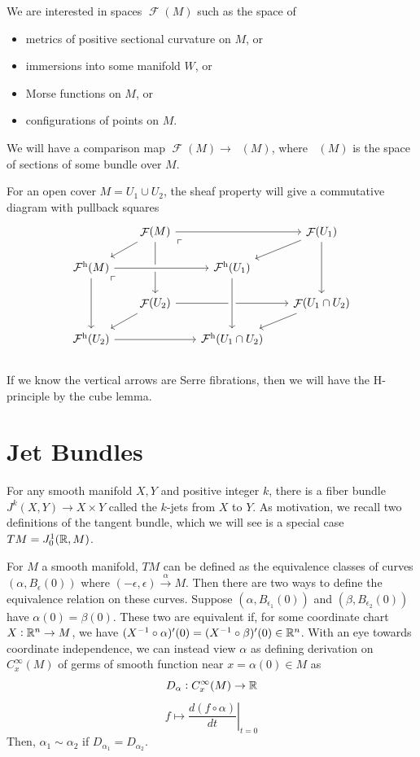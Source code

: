 \documentclass{article}
\newtheorem{proposed work}[theorem]{Proposed Work}
\theoremstyle{definition}
\DeclareMathOperator{\CF}{\mathcal F}
\DeclareMathOperator{\CFh}{\mathcal{F}^{h}} %
\begin{document}
We are interested in spaces $\CF(M)$ such as the space of
\begin{itemize}
  \item metrics of positive sectional curvature on $M$, or
  \item immersions into some manifold $W$, or
  \item Morse functions on $M$, or 
  \item configurations of points on $M$.
\end{itemize}
We will have a comparison map $\CF(M) \to \CFh(M)$, where $\CFh(M)$ is
the space of sections of some bundle over $M$.

For an open cover $M = U_1 \cup U_2$, the sheaf property will give a
commutative diagram with pullback squares
  \[
    \begin{tikzcd}[row sep=scriptsize, column sep=scriptsize]
      & \CF(M) \arrow[dl] \arrow[rr] \arrow[dd] \arrow[dr,
      phantom, "\ulcorner", very near start] & & \CF(U_1) \arrow[dl]
      \arrow[dd] \\
      \CFh(M) \arrow[rr, crossing over] \arrow[dd] \arrow[dr,
      phantom, "\ulcorner", very near start] & & \CFh(U_1) \\
      & \CF(U_2) \arrow[dl] \arrow[rr] & & \CF(U_1\cap U_2) \arrow[dl] \\
      \CFh(U_2) \arrow[rr] & & \CFh(U_1\cap U_2) \arrow[from=uu, crossing over]\\
    \end{tikzcd}
  \]
  If we know the vertical arrows are Serre fibrations, then we will
  have the H-principle by the cube lemma.
  
\section{Jet Bundles}

For any smooth manifold $X,Y$ and positive integer $k$, there is a fiber bundle $J^k(X,Y)\to X\times Y$ called the $k$-jets from $X$ to $Y$. As motivation, we recall two definitions of the tangent bundle, which we will see is a special case $TM=J^1_0(\mathbb R, M)$.

For $M$ a smooth manifold, $TM$ can be defined as the equivalence classes of curves $(\alpha, B_{\epsilon}(0))$ where $(-\epsilon, \epsilon) \xrightarrow{\alpha} M$. Then there are two ways to define the equivalence relation on these curves. Suppose $(\alpha, B_{\epsilon_1}(0))$ and $(\beta, B_{\epsilon_2}(0))$ have $\alpha(0)=\beta(0)$. These two are equivalent if, for some coordinate chart $X: \mathbb R^n\to M$, we have $(X^{-1}\circ \alpha)'(0) = (X^{-1}\circ \beta)'(0) \in \mathbb R^n$. With an eye towards coordinate independence, we can instead view $\alpha$ as defining derivation on $C^\infty_x(M)$ of germs of smooth function near $x=\alpha(0)\in M$ as
\[
  D_\alpha: C^\infty_x(M) \to \mathbb R
\]
\[
  f \mapsto \left.\frac{d(f\circ\alpha)}{dt}\right|_{t=0}
\]
Then, $\alpha_1\sim \alpha_2$ if $D_{\alpha_1}=D_{\alpha_2}$.
\end{document}
